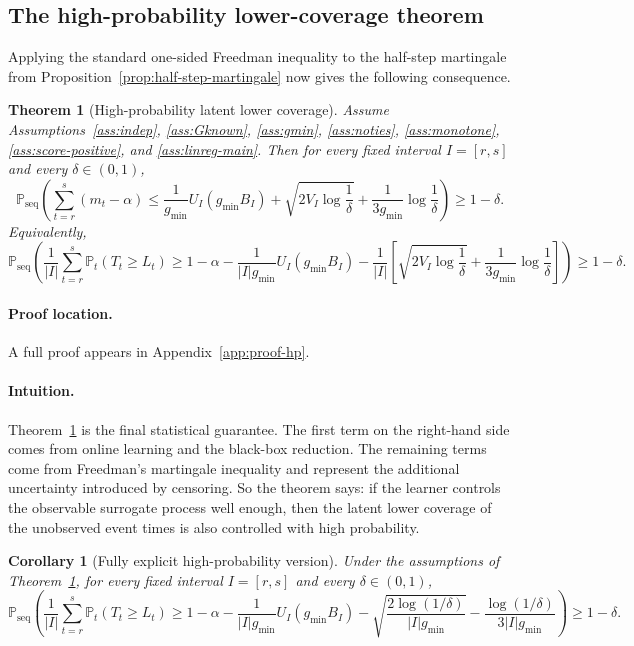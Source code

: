 \documentclass[11pt]{article}
\newtheorem{theorem}{Theorem}
\newtheorem{corollary}{Corollary}
\newcommand{\Prob}{\mathbb{P}}
\newcommand{\1}{\mathbf{1}}
\newcommand{\seq}{\mathrm{seq}}
\begin{document}
\subsection{The high-probability lower-coverage theorem}

Applying the standard one-sided Freedman inequality to the half-step martingale from Proposition~\ref{prop:half-step-martingale} now gives the following consequence.

\begin{theorem}[High-probability latent lower coverage]
\label{thm:freedman-main}
Assume Assumptions~\ref{ass:indep}, \ref{ass:Gknown}, \ref{ass:gmin}, \ref{ass:noties}, \ref{ass:monotone}, \ref{ass:score-positive}, and \ref{ass:linreg-main}. Then for every fixed interval $I=[r,s]$ and every $\delta\in(0,1)$,
\[
\Prob_{\seq}\!\left(
\sum_{t=r}^s(m_t-\alpha)
\le
\frac{1}{g_{\min}}U_I(g_{\min}B_I)
+
\sqrt{2V_I\log\frac{1}{\delta}}
+
\frac{1}{3g_{\min}}\log\frac{1}{\delta}
\right)
\ge 1-\delta.
\]
Equivalently,
\[
\Prob_{\seq}\!\left(
\frac{1}{|I|}\sum_{t=r}^s\Prob_t(T_t\ge L_t)
\ge
1-\alpha
-
\frac{1}{|I|g_{\min}}U_I(g_{\min}B_I)
-
\frac{1}{|I|}\left[
\sqrt{2V_I\log\frac{1}{\delta}}
+
\frac{1}{3g_{\min}}\log\frac{1}{\delta}
\right]
\right)
\ge 1-\delta.
\]
\end{theorem}

\paragraph{Proof location.} A full proof appears in Appendix~\ref{app:proof-hp}.


\paragraph{Intuition.} Theorem~\ref{thm:freedman-main} is the final statistical guarantee. The first term on the right-hand side comes from online learning and the black-box reduction. The remaining terms come from Freedman's martingale inequality and represent the additional uncertainty introduced by censoring. So the theorem says: if the learner controls the observable surrogate process well enough, then the latent lower coverage of the unobserved event times is also controlled with high probability.



\begin{corollary}[Fully explicit high-probability version]
\label{cor:explicit-main}
Under the assumptions of Theorem~\ref{thm:freedman-main}, for every fixed interval $I=[r,s]$ and every $\delta\in(0,1)$,
\[
\Prob_{\seq}\!\left(
\frac{1}{|I|}\sum_{t=r}^s\Prob_t(T_t\ge L_t)
\ge
1-\alpha
-
\frac{1}{|I|g_{\min}}U_I(g_{\min}B_I)
-
\sqrt{\frac{2\log(1/\delta)}{|I|g_{\min}}}
-
\frac{\log(1/\delta)}{3|I|g_{\min}}
\right)
\ge 1-\delta.
\]
\end{corollary}
\end{document}
